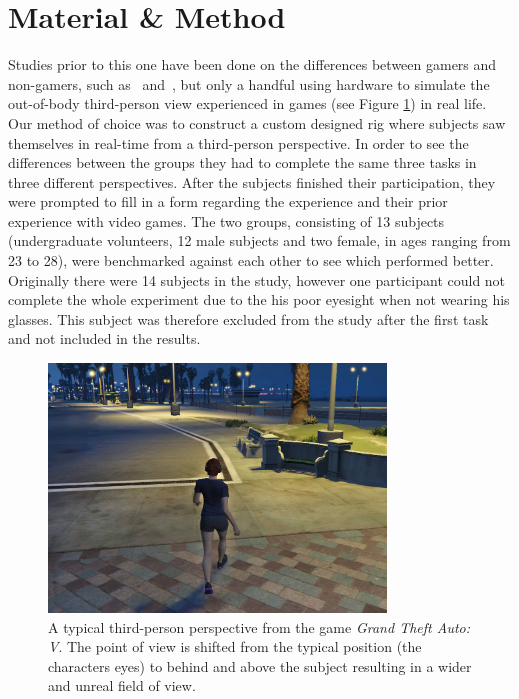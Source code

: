 \documentclass[runningheads,a4paper,oribibl]{llncs}
\begin{document}

\section{Material \& Method}
Studies prior to this one have been done on the differences between gamers and non-gamers, such as~\cite{schmierbach2011exploring} and~\cite{gong2015enhanced}, but only a handful using hardware to simulate the out-of-body third-person view experienced in games (see Figure \ref{fig:GTAIV}) in real life. Our method of choice was to construct a custom designed rig where subjects saw themselves in real-time from a third-person perspective. In order to see the differences between the groups they had to complete the same three tasks in three different perspectives. After the subjects finished their participation, they were prompted to fill in a form regarding the experience and their prior experience with video games. The two groups, consisting of 13 subjects (undergraduate volunteers, 12 male subjects and two female, in ages ranging from 23 to 28), were benchmarked against each other to see which performed better. Originally there were 14 subjects in the study, however one participant could not complete the whole experiment due to the his poor eyesight when not wearing his glasses. This subject was therefore excluded from the study after the first task and not included in the results.




\begin{figure}
   \centering
   \includegraphics[width=0.8\textwidth]{ExternalMaterial/GTA}
   \caption{A typical third-person perspective from the game \emph{Grand Theft Auto: V}. The point of view is shifted from the typical position (the characters eyes) to behind and above the subject resulting in a wider and unreal field of view. \label{fig:GTAIV}}
\end{figure}
\end{document}

